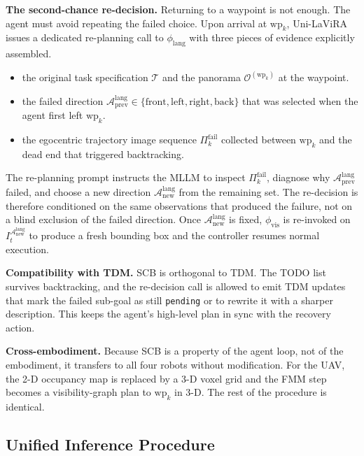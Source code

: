 \documentclass[conference]{IEEEtran}
\newcommand{\ourmethod}{Uni-LaViRA\xspace}
\begin{document}
\textbf{The second-chance re-decision.} Returning to a waypoint is not enough.
The agent must avoid repeating the failed choice. Upon arrival at
$\mathrm{wp}_k$, \ourmethod issues a dedicated re-planning call to
$\phi_{\mathrm{lang}}$ with three pieces of evidence explicitly assembled.
\begin{itemize}
  \item the original task specification $\mathcal{T}$ and the
  panorama $\mathcal{O}^{(\mathrm{wp}_k)}$ at the waypoint.
  \item the failed direction
  $\mathcal{A}^{\mathrm{lang}}_{\mathrm{prev}} \in
  \{\mathrm{front},\mathrm{left},\mathrm{right},\mathrm{back}\}$
  that was selected when the agent first left $\mathrm{wp}_k$.
  \item the egocentric trajectory image sequence $\Pi_k^{\mathrm{fail}}$
  collected between $\mathrm{wp}_k$ and the dead end that triggered
  backtracking.
\end{itemize}
The re-planning prompt instructs the MLLM to inspect $\Pi_k^{\mathrm{fail}}$,
diagnose why $\mathcal{A}^{\mathrm{lang}}_{\mathrm{prev}}$ failed, and choose
a new direction $\mathcal{A}^{\mathrm{lang}}_{\mathrm{new}}$ from the
remaining set. The re-decision is therefore conditioned on the same
observations that produced the failure, not on a blind exclusion of the failed
direction. Once $\mathcal{A}^{\mathrm{lang}}_{\mathrm{new}}$ is fixed,
$\phi_{\mathrm{vis}}$ is re-invoked on
$I^{\mathcal{A}^{\mathrm{lang}}_{\mathrm{new}}}_t$ to produce a fresh bounding
box and the controller resumes normal execution.

\textbf{Compatibility with TDM.} SCB is orthogonal to TDM. The TODO list
survives backtracking, and the re-decision call is allowed to emit TDM updates
that mark the failed sub-goal as still \texttt{pending} or to rewrite it with
a sharper description. This keeps the agent's high-level plan in sync with the
recovery action.

\textbf{Cross-embodiment.} Because SCB is a property of the agent loop, not of
the embodiment, it transfers to all four robots without modification. For the
UAV, the 2-D occupancy map is replaced by a 3-D voxel grid and the FMM step
becomes a visibility-graph plan to $\mathrm{wp}_k$ in 3-D. The rest of the
procedure is identical.

\subsection{Unified Inference Procedure}
\label{subsec:algorithm}
\end{document}
